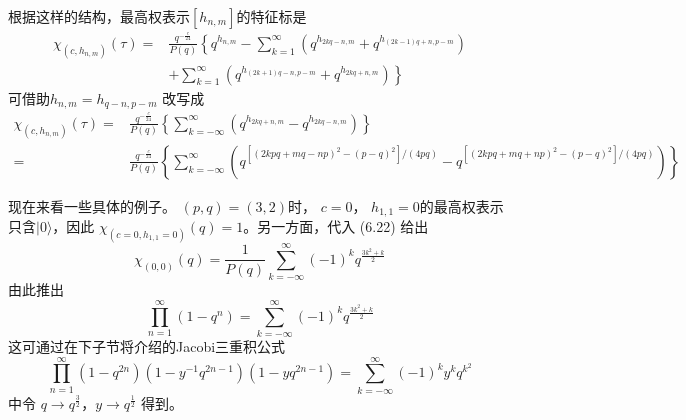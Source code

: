 根据这样的结构，最高权表示$ \left[h_{n, m}\right] $的特征标是
\begin{equation}
	\begin{aligned} \chi_{\left(c, h_{n, m}\right)}(\tau)=& \frac{q^{-\frac{c}{24}}}{P(q)}\left\{q^{h_{n, m}}-\sum_{k=1}^{\infty}\left(q^{h_{2 k q-n, m}}+q^{h_{(2 k-1) q+n, p-m}}\right)\right.\\&\left.+\sum_{k=1}^{\infty}\left(q^{h_{(2 k+1) q-n, p-m}}+q^{h_{2 k q+n, m}}\right)\right\} \end{aligned}
\end{equation}
可借助$ h_{n, m}=h_{q-n, p-m}$ 改写成
\begin{equation}
	\begin{aligned} \chi_{\left(c, h_{n, m}\right)}(\tau)=& \frac{q^{-\frac{c}{24}}}{P(q)}\left\{\sum_{k=-\infty}^{\infty}\left(q^{h_{2 k q+n, m}}-q^{h_{2 k q-n, m}}\right)\right\} \\ =&\frac{q^{-\frac{c}{24}}}{P(q)}\left\{\sum_{k=-\infty}^{\infty} \left(q^{\left[(2 k p q+m q-n p)^{2}-(p-q)^{2}\right] /(4 p q)}-q^{\left[(2 k p q+m q+n p)^{2}-(p-q)^{2}\right] /(4 p q)}\right)\right\} \end{aligned}
\end{equation} 

现在来看一些具体的例子。 $(p,q)=(3,2) $时， $c=0 $， $h_{1,1}=0 $的最高权表示只含$ |0\rangle $，因此 $\chi_{\left(c=0, h_{1,1}=0\right)}(q)=1 $。另一方面，代入 (6.22) 给出
\begin{equation}
	\chi_{(0,0)}(q)=\frac{1}{P(q)} \sum_{k=-\infty}^{\infty}(-1)^{k} q^{\frac{3 k^{2}+k}{2}} 
\end{equation}
由此推出
\begin{equation}
	\prod_{n=1}^{\infty}\left(1-q^{n}\right)=\sum_{k=-\infty}^{\infty}(-1)^{k} q^{\frac{3 k^{2}+k}{2}} 
\end{equation}
这可通过在下子节将介绍的Jacobi三重积公式
\begin{equation}
	\prod_{n=1}^{\infty}\left(1-q^{2 n}\right)\left(1-y^{-1} q^{2 n-1}\right)\left(1-y q^{2 n-1}\right)=\sum_{k=-\infty}^{\infty}(-1)^{k} y^{k} q^{k^{2}}
\end{equation} 
中令 $q \rightarrow q^{\frac{3}{2}} $，$ y \rightarrow q^{\frac{1}{2}}$ 得到。

